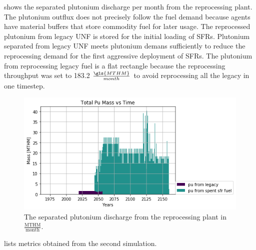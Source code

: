  shows the separated plutonium discharge per month from the reprocessing plant. The plutonium outflux does not precisely follow the fuel demand because \Cyclus agents have material buffers that store commodity fuel for later usage. The reprocessed plutonium from legacy \gls{UNF} is stored for the initial loading of \glspl{SFR}.  Plutonium separated from legacy \gls{UNF} meets plutonium demans sufficiently to reduce the reprocessing demand for the first aggressive deployment of \glspl{SFR}.  The plutonium from reprocessing legacy fuel is a flat rectangle because the reprocessing throughput was set to 183.2 $\frac{\gls{MTHM}}{month}$ to avoid reprocessing all the legacy in one timestep. 
 

\begin{figure}[htbp!]
    \begin{center}
        \includegraphics[scale=0.7]{./images/french-transition/pu.png}
    \end{center}
    \caption{The separated plutonium discharge from the reprocessing plant 
        in $\frac{\mbox{MTHM}}{\mbox{month}}$.}
    \label{fig:pu_no_cum}
\end{figure}


 lists metrics obtained from the second simulation.


